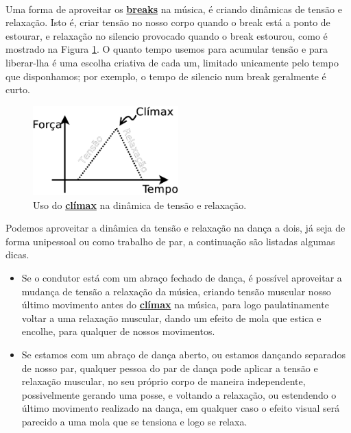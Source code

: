 ~


Uma forma de aproveitar os \hyperref[sec:UsandoBreak]{\textbf{breaks}} na música,
é criando dinâmicas de tensão e relaxação.
Isto é, criar tensão  no nosso corpo quando o break está a ponto de estourar,
e relaxação no silencio provocado quando o break estourou,
como é mostrado na Figura \ref{fig:tension-release-climax}.
O quanto tempo usemos para acumular tensão e para liberar-lha 
é uma escolha criativa de cada um, 
limitado unicamente pelo tempo que disponhamos;
por exemplo, o tempo de silencio num break geralmente é curto.



\begin{figure}[!h]
  \centering
    \includegraphics[width=0.5\textwidth]{chapters/cap-musicalidade/tension-release-climax.eps}
\caption{Uso do \hyperref[ref:climax]{\textbf{clímax}} na dinâmica de tensão e relaxação.}
\label{fig:tension-release-climax}
\end{figure}



Podemos aproveitar a dinâmica da tensão e relaxação na dança a dois,
já seja de forma unipessoal ou como trabalho de par,
a continuação são listadas algumas dicas.
\begin{itemize}
\item Se o condutor está com um abraço fechado de dança, 
é possível aproveitar a mudança de tensão a relaxação da música,
criando tensão muscular nosso último movimento antes do \hyperref[ref:climax]{\textbf{clímax}} na música,
para logo paulatinamente voltar a uma relaxação muscular,
dando um efeito de mola que estica e encolhe,
para qualquer de nossos movimentos.
\item Se estamos com um abraço de dança aberto, ou estamos dançando separados de nosso par,
qualquer pessoa do par de dança pode aplicar a tensão e relaxação muscular, 
no seu próprio corpo de maneira independente, possivelmente gerando uma posse,
e voltando a relaxação, ou estendendo o último movimento realizado na dança,
em qualquer caso o efeito visual será parecido a uma mola que se tensiona e logo se relaxa.
\end{itemize}



